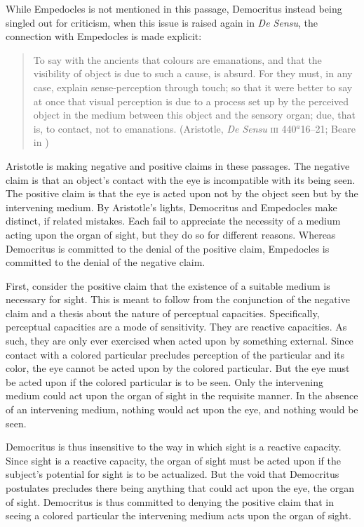While Empedocles is not mentioned in this passage, Democritus instead being singled out for criticism, when this issue is raised again in \emph{De Sensu}, the connection with Empedocles is made explicit:
\begin{quote}
	To say with the ancients that colours are emanations, and that the visibility of object is due to such a cause, is absurd. For they must, in any case, explain sense-perception through touch; so that it were better to say at once that visual perception is due to a process set up by the perceived object in the medium between this object and the sensory organ; due, that is, to contact, not to emanations. (Aristotle, \emph{De Sensu} \textsc{iii} 440\( ^{a} \)16--21; Beare in \citealt[9]{Barnes:1984uq})
\end{quote}

Aristotle is making negative and positive claims in these passages. The negative claim is that an object's contact with the eye is incompatible with its being seen. The positive claim is that the eye is acted upon not by the object seen but by the intervening medium. By Aristotle's lights, Democritus and Empedocles make distinct, if related mistakes. Each fail to appreciate the necessity of a medium acting upon the organ of sight, but they do so for different reasons. Whereas Democritus is committed to the denial of the positive claim, Empedocles is committed to the denial of the negative claim.

First, consider the positive claim that the existence of a suitable medium is necessary for sight. This is meant to follow from the conjunction of the negative claim and a thesis about the nature of perceptual capacities. Specifically, perceptual capacities are a mode of sensitivity. They are reactive capacities. As such, they are only ever exercised when acted upon by something external. Since contact with a colored particular precludes perception of the particular and its color, the eye cannot be acted upon by the colored particular. But the eye must be acted upon if the colored particular is to be seen. Only the intervening medium could act upon the organ of sight in the requisite manner. In the absence of an intervening medium, nothing would act upon the eye, and nothing would be seen.

Democritus is thus insensitive to the way in which sight is a reactive capacity. Since sight is a reactive capacity, the organ of sight must be acted upon if the subject's potential for sight is to be actualized. But the void that Democritus postulates precludes there being anything that could act upon the eye, the organ of sight. Democritus is thus committed to denying the positive claim that in seeing a colored particular the intervening medium acts upon the organ of sight.

